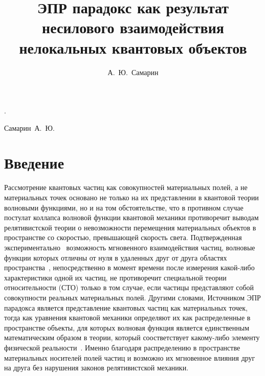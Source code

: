 \documentclass[10pt,twoside,book,a5paper]{ncc}
\begin{document}
. 

\title{ЭПР парадокс как результат несилового взаимодействия нелокальных квантовых объектов}

\author{А.~Ю.~Самарин}{Самарин~А.~Ю.}

\maketitle	



\section*{Введение}

Рассмотрение квантовых частиц как совокупностей материальных полей, а не материальных точек основано не только на их представлении в квантовой теории волновыми функциями, но и на том обстоятельстве, что в противном случае постулат коллапса волновой функции квантовой механики противоречит выводам релятивистской теории о невозможности перемещения материальных объектов в пространстве со скоростью, превышающей скорость света. Подтвержденная экспериментально~\cite{sau:1} возможность мгновенного взаимодействия частиц, волновые функции которых отличны от нуля в удаленных друг от друга областях пространства~\cite{sau:2}, непосредственно в момент времени после измерения какой-либо характеристики одной их частиц, не противоречит специальной теории относительности (СТО) только в том случае, если частицы представляют собой совокупности реальных материальных полей.
Другими словами, Источником ЭПР парадокса является представление квантовых частиц как материальных точек, тогда как уравнения квантовой механики определяют их как распределенные в пространстве объекты, для которых волновая функция является единственным математическим образом в теории, который соостветствует какому-либо элементу физической реальности~\cite{sau:3}. Именно благодаря распределению в пространстве материальных носителей полей частиц и возможно их мгновенное влияния друг на друга без нарушения законов релятивистской механики.
\end{document}
